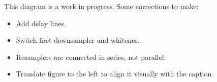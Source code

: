 \documentclass{amsart}
\begin{document}
This diagram is a work in progress.  Some corrections to make:

{\color{red}
\begin{itemize}
\item Add delay lines.
\item Switch first downsampler and whitener.
\item Resamplers are connected in series, not parallel.
\item Translate figure to the left to align it visually with the caption.
\end{itemize}
}
\end{document}
